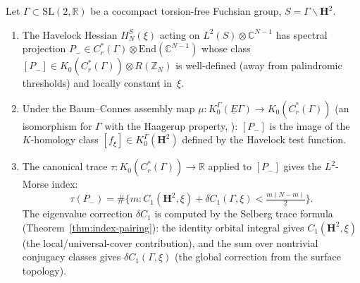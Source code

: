 \begin{theorem}
\label{thm:assembly-map}
Let $\Gamma \subset \mathrm{SL}(2,\mathbb{R})$ be a cocompact
torsion-free Fuchsian group, $S = \Gamma\backslash\mathbf{H}^2$.
\begin{enumerate}
  \item[\emph{(a)}]
    The Havelock Hessian $H_N^S(\xi)$ acting on
    $L^2(S) \otimes \mathbb{C}^{N-1}$ has spectral projection
    $P_- \in C^*_r(\Gamma) \otimes \mathrm{End}(\mathbb{C}^{N-1})$
    whose class $[P_-] \in K_0(C^*_r(\Gamma)) \otimes R(\mathbb{Z}_N)$
    is well-defined (away from palindromic thresholds) and
    locally constant in~$\xi$.
  \item[\emph{(b)}]
    Under the Baum--Connes assembly map
    $\mu \colon K_0^\Gamma(\underline{E}\Gamma) \to K_0(C^*_r(\Gamma))$
    (an isomorphism for $\Gamma$ with the Haagerup property,
    \citealt{Kasparov1988}):
    $[P_-]$ is the image of the $K$-homology class
    $[f_\xi] \in K_0^\Gamma(\mathbf{H}^2)$ defined by the
    Havelock test function.
  \item[\emph{(c)}]
    The canonical trace $\tau \colon K_0(C^*_r(\Gamma)) \to \mathbb{R}$
    applied to $[P_-]$ gives the $L^2$-Morse index:
    \[
      \tau(P_-)
      = \#\bigl\{m : C_1(\mathbf{H}^2,\xi)
        + \delta C_1(\Gamma,\xi)
        < \tfrac{m(N{-}m)}{2}\bigr\}.
    \]
    The eigenvalue correction $\delta C_1$ is computed by the
    Selberg trace formula
    (Theorem~\ref{thm:index-pairing}): the
    identity orbital integral gives
    $C_1(\mathbf{H}^2, \xi)$ (the local/universal-cover
    contribution), and the sum over nontrivial
    conjugacy classes gives $\delta C_1(\Gamma,\xi)$
    (the global correction from the surface topology).
\end{enumerate}
\end{theorem}

